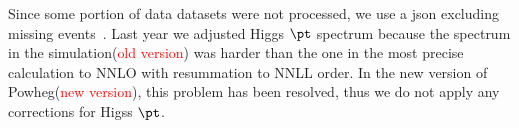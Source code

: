 Since some portion of data datasets were not processed, 
we use a json excluding missing events~\cite{json}. 
Last year we adjusted Higgs $\pt$ spectrum because 
the spectrum in the simulation(\textcolor{red}{old version}) was harder than the one 
in the most precise calculation to NNLO with resummation to NNLL order.
In the new version of Powheg(\textcolor{red}{new version}), this problem has been resolved,
thus we do not apply any corrections for Higss $\pt$.
